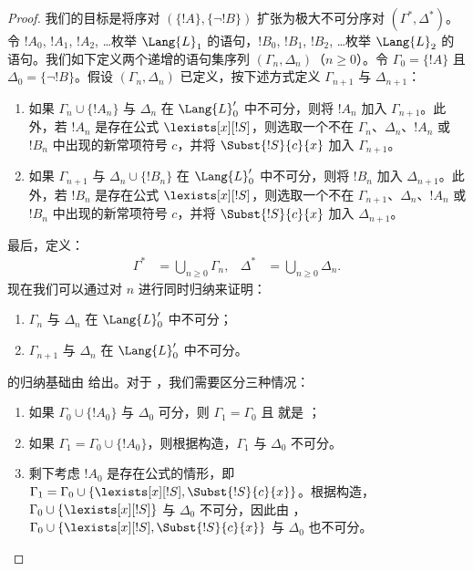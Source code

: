 \documentclass[../../../include/open-logic-section]{subfiles}
\begin{document}
\begin{proof}
我们的目标是将序对 $(\{ !A \}, \{\lnot!B\})$ 扩张为极大不可分序对 $(\Gamma^*, \Delta^*)$。令 $!A_0$, $!A_1$, $!A_2$, \dots 枚举 $\Lang{L}_1$ 的语句，$!B_0$, $!B_1$, $!B_2$, \dots 枚举 $\Lang{L}_2$ 的语句。我们如下定义两个递增的语句集序列 $(\Gamma_n, \Delta_n)$（$n \ge 0$）。令 $\Gamma_0 = \{ !A\}$ 且 $\Delta_0 = \{\lnot !B \}$。假设 $(\Gamma_n, \Delta_n)$ 已定义，按下述方式定义 $\Gamma_{n+1}$ 与 $\Delta_{n+1}$：
\begin{enumerate}
\item 如果 $\Gamma_n \cup \{!A_n \}$ 与 $\Delta_n$ 在 $\Lang{L}'_0$ 中不可分，则将 $!A_n$ 加入 $\Gamma_{n+1}$。此外，若 $!A_n$ 是存在公式 $\lexists[x][!S]$，则选取一个不在 $\Gamma_n$、$\Delta_n$、$!A_n$ 或 $!B_n$ 中出现的新常项符号 $c$，并将 $\Subst{!S}{c}{x}$ 加入 $\Gamma_{n+1}$。
\item 如果 $\Gamma_{n+1}$ 与 $\Delta_n \cup \{!B_n \}$ 在 $\Lang{L}'_0$ 中不可分，则将 $!B_n$ 加入 $\Delta_{n+1}$。此外，若 $!B_n$ 是存在公式 $\lexists[x][!S]$，则选取一个不在 $\Gamma_{n+1}$、$\Delta_n$、$!A_n$ 或 $!B_n$ 中出现的新常项符号 $c$，并将 $\Subst{!S}{c}{x}$ 加入 $\Delta_{n+1}$。
\end{enumerate}
最后，定义：
\begin{align*}
  \Gamma^* & = \bigcup_{n\ge 0} \Gamma_n, &
  \Delta^* & = \bigcup_{n\ge 0} \Delta_n.
\end{align*}
现在我们可以通过对 $n$ 进行同时归纳来证明：
\begin{enumerate}
\item{} $\Gamma_n$ 与 $\Delta_n$ 在 $\Lang{L}'_0$ 中不可分；
\item{} $\Gamma_{n+1}$ 与 $\Delta_n$ 在 $\Lang{L}'_0$ 中不可分。
\end{enumerate}
 的归纳基础由  给出。对于 ，我们需要区分三种情况：
\begin{enumerate}
\item 如果 $\Gamma_0 \cup \{!A_0 \}$ 与 $\Delta_0$ 可分，则 $\Gamma_1 = \Gamma_0$ 且  就是 ；
\item 如果 $\Gamma_1 = \Gamma_0 \cup\{ !A_0\}$，则根据构造，$\Gamma_1$ 与 $\Delta_0$ 不可分。
\item 剩下考虑 $!A_0$ 是存在公式的情形，即 $\Gamma_1 = \Gamma_0 \cup \{ \lexists[x][!S], \Subst{!S}{c}{x}
  \}$。根据构造，$\Gamma_0 \cup \{ \lexists[x][!S]\}$ 与 $\Delta_0$ 不可分，因此由 ，$\Gamma_0 \cup \{ \lexists[x][!S], \Subst{!S}{c}{x} \}$ 与 $\Delta_0$ 也不可分。
\end{enumerate}

\end{proof}
\end{document}
